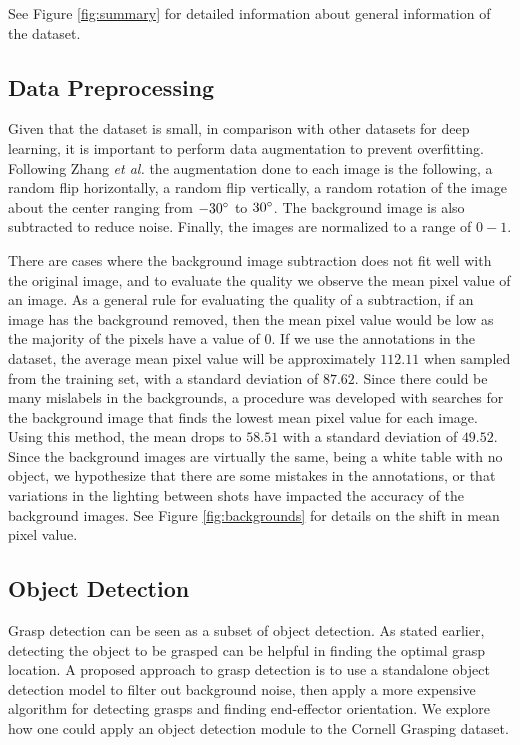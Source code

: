 \documentclass{article}
\begin{document}
See Figure \ref{fig:summary} for detailed information about general
information of the dataset.


\subsection{Data Preprocessing}
Given that the dataset is small, in comparison with other datasets for deep
learning, it is important to perform data augmentation to prevent overfitting.
Following Zhang \textit{et al.} \cite{zhang18} the augmentation done to each
image is the following, a random flip horizontally, a random flip vertically,
a random rotation of the image about the center ranging from $-30\degree$ to
$30\degree$. The background image is also subtracted to reduce noise. Finally,
the images are normalized to a range of $0-1$.

There are cases where the background image subtraction does not fit well with the
original image, and to evaluate the quality we observe the mean pixel value of an
image. As a general rule for evaluating the quality of a subtraction, if an image
has the background removed, then the mean pixel value would be low as the
majority of the pixels have a value of $0$.
If we use the annotations in the dataset, the average
mean pixel value will be approximately $112.11$ when sampled from the training set,
with a standard deviation of $87.62$. Since there could be many mislabels in the
backgrounds, a procedure was developed with searches for the background image that
finds the lowest mean pixel value for each image. Using this method, the mean
drops to $58.51$ with a standard deviation of $49.52$. Since the background images are
virtually the same, being a white table with no object, we hypothesize that there
are some mistakes in the annotations, or that variations in the lighting between shots
have impacted the accuracy of the background images. See Figure \ref{fig:backgrounds} for
details on the shift in mean pixel value.

\newpage
\subsection{Object Detection}
Grasp detection can be seen as a subset of object detection.
As stated earlier, detecting the object to be grasped can be helpful in finding the
optimal grasp location. A proposed approach to grasp detection is to use a standalone
object detection model to filter out background noise, then apply a more expensive
algorithm for detecting grasps and finding end-effector orientation. We explore how
one could apply an object detection module to the Cornell Grasping dataset.
\end{document}
